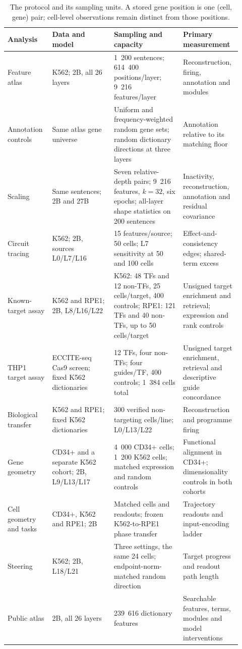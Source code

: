 \documentclass[review,authoryear,12pt]{elsarticle}
\begin{document}
\begin{table}[htbp]
\centering
\caption{The protocol and its sampling units. A stored gene position is one (cell, gene) pair;
cell-level observations remain distinct from those positions.}
\label{tab:grid}
\footnotesize\linespread{1}\selectfont
\setlength{\tabcolsep}{3pt}
\begin{tabular}{@{}L{0.18\linewidth}L{0.25\linewidth}L{0.28\linewidth}L{0.21\linewidth}@{}}
\toprule
\textbf{Analysis} & \textbf{Data and model} & \textbf{Sampling and capacity} & \textbf{Primary measurement} \\
\midrule
Feature atlas & K562; 2B, all 26 layers & 1~200 sentences; 614~400 positions/layer;
9~216 features/layer & Reconstruction, firing, annotation and modules \\
Annotation controls & Same atlas gene universe & Uniform and frequency-weighted random gene sets;
random dictionary directions at three layers & Annotation relative to its matching floor \\
Scaling & Same sentences; 2B and 27B & Seven relative-depth pairs; 9~216 features,
$k=32$, six epochs; all-layer shape statistics on 200 sentences & Inactivity, reconstruction,
annotation and residual covariance \\
Circuit tracing & K562; 2B, sources L0/L7/L16 & 15 features/source; 50 cells;
L7 sensitivity at 50 and 100 cells & Effect-and-consistency edges; shared-term excess \\
Known-target assay & K562 and RPE1; 2B, L8/L16/L22 & K562: 48 TFs and 12 non-TFs,
25 cells/target, 400 controls; RPE1: 121 TFs and 40 non-TFs, up to 50 cells/target & Unsigned
target enrichment and retrieval; expression and rank controls \\
THP1 target assay & ECCITE-seq Cas9 screen; fixed K562 dictionaries & 12 TFs, four non-TFs;
four guides/TF, 400 controls; 1~384 cells total & Unsigned target enrichment, retrieval
and descriptive guide concordance \\
Biological transfer & K562 and RPE1; fixed K562 dictionaries & 300 verified non-targeting
cells/line; L0/L13/L22 & Reconstruction and programme firing \\
Gene geometry & CD34+ and a separate K562 cohort; 2B, L9/L13/L17 & 4~000 CD34+ cells;
1~200 K562 cells; matched expression and random controls & Functional alignment in CD34+;
dimensionality controls in both cohorts \\
Cell geometry and tasks & CD34+, K562 and RPE1; 2B & Matched cells and readouts; frozen
K562-to-RPE1 phase transfer & Trajectory readouts and input-encoding ladder \\
Steering & K562; 2B, L18/L21 & Three settings, the same 24 cells;
endpoint-norm-matched random direction & Target progress and readout path length \\
Public atlas & 2B, all 26 layers & 239~616 dictionary features & Searchable features,
terms, modules and model interventions \\
\bottomrule
\end{tabular}
\end{table}
\end{document}
